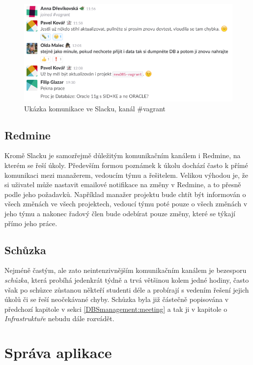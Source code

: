 \begin{figure}[h]
\includegraphics[width=\textwidth]{../png/slack.png}
\caption{Ukázka komunikace ve Slacku, kanál \#vagrant} \label{picture:slack}
\end{figure}

\subsection{Redmine}

Kromě Slacku je samozřejmě důležitým komunikačním kanálem i Redmine, na kterém se řeší úkoly. Především formou poznámek k úkolu dochází často k přímé komunikaci mezi manažerem, vedoucím týmu a řešitelem. Velikou výhodou je, že si uživatel může nastavit emailové notifikace na změny v Redmine, a to přesně podle jeho požadavků. Například manažer projektu bude chtít být informován o všech změnách ve všech projektech, vedoucí týmu poté pouze o všech změnách v jeho týmu a nakonec řadový člen bude odebírat pouze změny, které se týkají přímo jeho práce.

\subsection{Schůzka}

Nejméně častým, ale zato neintenzivnějším komunikačním kanálem je bezesporu \emph{schůzka}, která probíhá jedenkrát týdně a trvá většinou kolem jedné hodiny, často však po schůzce zůstanou někteří studenti déle a probírají s vedením řešení jejich úkolů či se řeší neočekávané chyby. Schůzka byla již částečně popisována v předchozí kapitole v sekci \ref{DBSmanagement:meeting} a tak ji v kapitole o \emph{Infrastruktuře} nebudu dále rozvádět.


\section{Správa aplikace}


